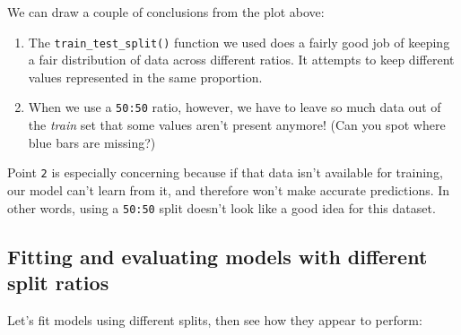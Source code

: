 \documentclass[11pt]{article}
\begin{document}
    
    
    We can draw a couple of conclusions from the plot above:

\begin{enumerate}
\def\labelenumi{\arabic{enumi}.}
\item
  The \texttt{train\_test\_split()} function we used does a fairly good
  job of keeping a fair distribution of data across different ratios. It
  attempts to keep different values represented in the same proportion.
\item
  When we use a \texttt{50:50} ratio, however, we have to leave so much
  data out of the \emph{train} set that some values aren't present
  anymore! (Can you spot where blue bars are missing?)
\end{enumerate}

Point \texttt{2} is especially concerning because if that data isn't
available for training, our model can't learn from it, and therefore
won't make accurate predictions. In other words, using a \texttt{50:50}
split doesn't look like a good idea for this dataset.

    \hypertarget{fitting-and-evaluating-models-with-different-split-ratios}{%
\subsection{Fitting and evaluating models with different split
ratios}\label{fitting-and-evaluating-models-with-different-split-ratios}}

Let's fit models using different splits, then see how they appear to
perform:
\end{document}
